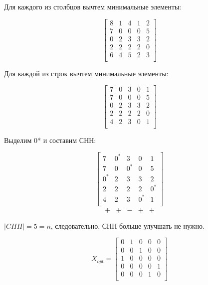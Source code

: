 \documentclass[a4paper,14pt]{article}
\begin{document}
Для каждого из столбцов вычтем минимальные элементы:

\begin{equation}
\begin{bmatrix}
	 8  &   1  &   4  &   1  &   2\\
     7  &   0  &   0  &   0  &   5\\
     0  &   2  &   3  &   3  &   2\\
     2  &   2  &   2  &   2  &   0\\
     6  &   4  &   5  &   2  &   3\\
\end{bmatrix}
\end{equation}

Для каждой из строк вычтем минимальные элементы:

\begin{equation}
\begin{bmatrix}
     7  &   0  &   3  &   0  &   1\\
     7  &   0  &   0  &   0  &   5\\
     0  &   2  &   3  &   3  &   2\\
     2  &   2  &   2  &   2  &   0\\
     4  &   2  &   3  &   0  &   1\\
\end{bmatrix}
\end{equation}

\newpage
Выделим 0* и составим СНН:

\begin{equation}
\begin{bmatrix}
     7    &   0^*  &   3    &   0    &   1\\
     7    &   0    &   0^*  &   0    &   5\\
     0^*  &   2    &   3    &   3    &   2\\
     2    &   2    &   2    &   2    &   0^*\\
     4    &   2    &   3    &   0^*  &   1\\
\end{bmatrix}
\end{equation}
\begin{equation}
\begin{matrix}
+ & + & - & + & +
\end{matrix}
\end{equation}

$|CHH| = 5 = n$, следовательно, СНН больше улучшать не нужно. 

\begin{equation} X_{opt} = 
\begin{bmatrix}
     0  &   1  &   0  &   0  &   0\\
     0  &   0  &   1  &   0  &   0\\
     1  &   0  &   0  &   0  &   0\\
     0  &   0  &   0  &   0  &   1\\
     0  &   0  &   0  &   1  &   0\\
\end{bmatrix}
\end{equation}
\end{document}
